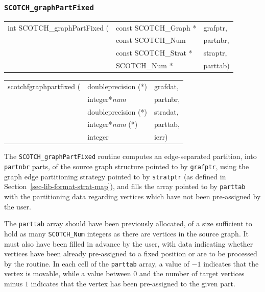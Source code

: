 \subsubsection{{\tt SCOTCH\_graphPartFixed}}
\label{sec-lib-func-graphpartfixed}

\begin{itemize}
\progsyn

{\tt\begin{tabular}{l@{}ll}
int SCOTCH\_graphPartFixed ( & const SCOTCH\_Graph * & grafptr, \\
                             & const SCOTCH\_Num     & partnbr, \\
                             & const SCOTCH\_Strat * & straptr, \\
                             & SCOTCH\_Num *         & parttab)
\end{tabular}}

{\tt\begin{tabular}{l@{}ll}
scotchfgraphpartfixed ( & doubleprecision (*)   & grafdat, \\
                        & integer*{\it num}     & partnbr, \\
                        & doubleprecision (*)   & stradat, \\
                        & integer*{\it num} (*) & parttab, \\
                        & integer               & ierr)
\end{tabular}}

\progdes

The {\tt SCOTCH\_graphPartFixed} routine computes an edge-separated
partition, into {\tt partnbr} parts, of the source graph structure
pointed to by {\tt grafptr}, using the graph edge partitioning
strategy pointed to by {\tt stratptr} (as defined in
Section~\ref{sec-lib-format-strat-map}), and fills the array pointed
to by {\tt parttab} with the partitioning data regarding vertices
which have not been pre-assigned by the user.

The {\tt parttab} array should have been previously allocated, of a
size sufficient to hold as many {\tt SCOTCH\_\lbt Num} integers as
there are vertices in the source graph. It must also have been filled
in advance by the user, with data indicating whether vertices have
been already pre-assigned to a fixed position or are to be processed
by the routine. In each cell of the {\tt parttab} array, a value of
$-1$ indicates that the vertex is movable, while a value between $0$
and the number of target vertices minus $1$ indicates that the vertex
has been pre-assigned to the given part.


\end{itemize}

